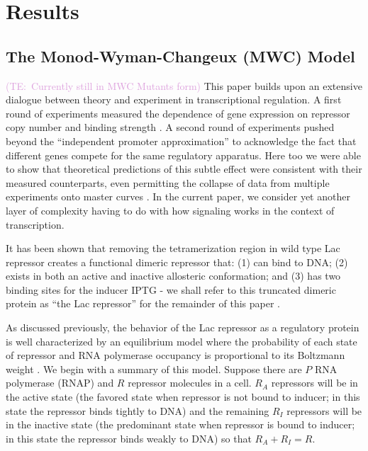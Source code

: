 \documentclass[10pt,letterpaper]{article}
\newcommand{\talComment}[1]{\textcolor{Plum}{(TE:~#1)}}
\begin{document}
\section*{Results}

\subsection*{The Monod-Wyman-Changeux (MWC) Model} 

\talComment{Currently still in MWC Mutants form}
This paper builds upon an extensive dialogue between theory and experiment in
transcriptional regulation. A first round of experiments measured the dependence
of gene expression on repressor copy number and binding strength
\cite{Garcia2011}. A second round of experiments pushed beyond the ``independent
promoter approximation'' to acknowledge the fact that different genes compete
for the same regulatory apparatus. Here too we were able to show that
theoretical predictions of this subtle effect were consistent with their
measured counterparts, even permitting the collapse of data from multiple
experiments onto master curves \cite{Brewster2014, Weinert2014a}. In the current
paper, we consider yet another layer of complexity having to do with how
signaling works in the context of transcription.

It has been shown that removing the tetramerization region in wild type Lac
repressor creates a functional dimeric repressor that: (1) can bind to DNA; (2)
exists in both an active and inactive allosteric conformation; and (3) has two
binding sites for the inducer IPTG - we shall refer to this truncated dimeric
protein as ``the Lac repressor'' for the remainder of this paper
\cite{Daber2011a, Daber2009}.

As discussed previously, the behavior of the Lac repressor  as a regulatory
protein is well characterized by an equilibrium model where the probability of
each state of repressor and RNA polymerase occupancy is proportional to its
Boltzmann weight \cite{Ackers1982, Buchler2003, Phillips2015a}. We begin with a
summary of this model. Suppose there are \(P\) RNA polymerase (RNAP) and \(R\)
repressor molecules in a cell. \(R_A\) repressors will be in the active state
(the favored state when repressor is not bound to inducer; in this state the
repressor binds tightly to DNA) and the remaining \(R_I\) repressors will be in
the inactive state (the predominant state when repressor is bound to inducer; in
this state the repressor binds weakly to DNA) so that \(R_A+R_I=R\).
\end{document}
